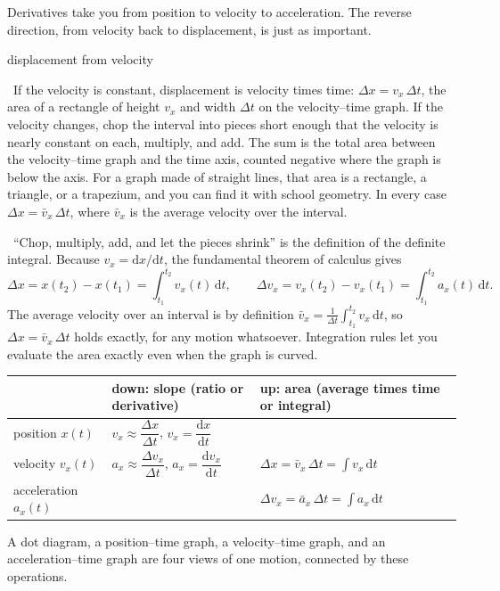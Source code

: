 \documentclass[11pt,twoside,openany]{book}
\newcommand{\dd}{\mathrm{d}}
\newcommand{\viewtag}[3]{\fcolorbox{#2}{#3}{\footnotesize\textbf{\textcolor{#2}{#1}}}}
\newcommand{\elemtag}{\viewtag{Elementary}{elemcol}{elempale}}
\newcommand{\calctag}{\viewtag{Calculus}{calccol}{calcpale}}
\newcommand{\elem}{\par\medskip\noindent\elemtag\ }
\newcommand{\calc}{\par\medskip\noindent\calctag\ }
\begin{document}
Derivatives take you from position to velocity to acceleration. The reverse direction, from velocity back to displacement, is just as important.

\begin{twoviews}{displacement from velocity}
\elem If the velocity is constant, displacement is velocity times time: $\Delta x = v_x\,\Delta t$, the area of a rectangle of height $v_x$ and width $\Delta t$ on the velocity--time graph. If the velocity changes, chop the interval into pieces short enough that the velocity is nearly constant on each, multiply, and add. The sum is the total area between the velocity--time graph and the time axis, counted negative where the graph is below the axis. For a graph made of straight lines, that area is a rectangle, a triangle, or a trapezium, and you can find it with school geometry. In every case $\Delta x = \bar v_x\,\Delta t$, where $\bar v_x$ is the average velocity over the interval.

\calc ``Chop, multiply, add, and let the pieces shrink'' is the definition of the definite integral. Because $v_x = \dd x/\dd t$, the fundamental theorem of calculus gives
\begin{equation}
\Delta x = x(t_2) - x(t_1) = \int_{t_1}^{t_2} v_x(t)\,\dd t,
\qquad
\Delta v_x = v_x(t_2) - v_x(t_1) = \int_{t_1}^{t_2} a_x(t)\,\dd t.
\label{eq:ftc}
\end{equation}
The average velocity over an interval is by definition $\bar v_x = \frac{1}{\Delta t}\int_{t_1}^{t_2} v_x\,\dd t$, so $\Delta x = \bar v_x\,\Delta t$ holds exactly, for any motion whatsoever. Integration rules let you evaluate the area exactly even when the graph is curved.
\end{twoviews}

\begin{keyidea}
\begin{center}
\renewcommand{\arraystretch}{1.4}
\small
\begin{tabular}{lll}
\toprule
 & down: slope (ratio or derivative) & up: area (average times time or integral) \\
\midrule
position $x(t)$ & $v_x \approx \dfrac{\Delta x}{\Delta t}$, \; $v_x = \dfrac{\dd x}{\dd t}$ & \\[6pt]
velocity $v_x(t)$ & $a_x \approx \dfrac{\Delta v_x}{\Delta t}$, \; $a_x = \dfrac{\dd v_x}{\dd t}$ & $\Delta x = \bar v_x\,\Delta t = \displaystyle\int v_x\,\dd t$ \\[6pt]
acceleration $a_x(t)$ & & $\Delta v_x = \bar a_x\,\Delta t = \displaystyle\int a_x\,\dd t$ \\
\bottomrule
\end{tabular}
\end{center}
A dot diagram, a position--time graph, a velocity--time graph, and an acceleration--time graph are four views of one motion, connected by these operations.
\end{keyidea}
\end{document}
